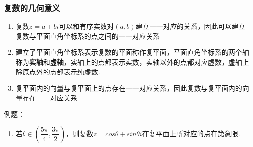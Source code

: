 \subsubsection*{复数的几何意义}
\begin{enumerate}
    \item 复数$z = a + bi$可以和有序实数对$(a, b)$建立一一对应的关系，因此可以建立复数与平面直角坐标系的点之间的一一对应关系
    \item 建立了平面直角坐标系表示复数的平面称作复平面，平面直角坐标系的两个轴称为\textbf{实轴}和\textbf{虚轴}，实轴上的点都表示实数，实轴以外的点都对应虚数，虚轴上除原点外的点都表示纯虚数.
    \begin{example}
    \end{example}
    \item 复平面内的向量与复平面上的点存在一一对应关系，因此复数与复平面内的向量存在一一对应关系
\end{enumerate}
例题：
\begin{enumerate}
    \item 若$\theta \in \left(\dfrac{5\pi}{4}, \dfrac{3\pi}{2}\right)$，则复数$z = cos\theta + sin\theta i$在复平面上所对应的点在第象限.
\end{enumerate}
